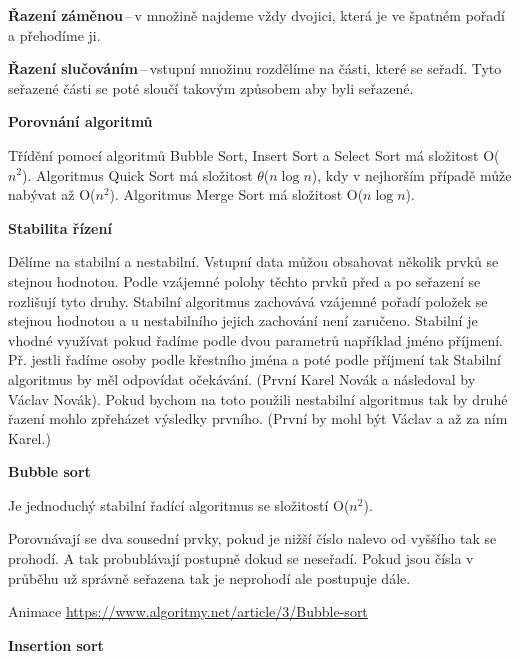 \textbf{Řazení záměnou}\,--\,v množině najdeme vždy dvojici, která je ve špatném pořadí a přehodíme ji.

\textbf{Řazení slučováním}\,--\,vstupní množinu rozdělíme na části, které se seřadí. Tyto seřazené části se poté sloučí takovým způsobem aby byli seřazené.

\begin{Large}\vspace{0,5cm} \textbf{Porovnání algoritmů}
\end{Large}

Třídění pomocí algoritmů Bubble Sort, Insert Sort a Select Sort má složitost O($n^2$). Algoritmus Quick Sort má složitost $\theta$($n\log{n}$), kdy v nejhorším případě může nabývat až O($n^2$). Algoritmus Merge Sort má složitost O($n\log{n}$).

\begin{Large}\vspace{0,5cm} \textbf{Stabilita řízení}
\end{Large}

Dělíme na stabilní a nestabilní. Vstupní data můžou obsahovat několik prvků se stejnou hodnotou. Podle vzájemné polohy těchto prvků před a po seřazení se rozlišují tyto druhy. Stabilní algoritmus zachovává vzájemné pořadí položek se stejnou hodnotou a u nestabilního jejich zachování není zaručeno. Stabilní je vhodné využívat pokud řadíme podle dvou parametrů například jméno příjmení. Př. jestli řadíme osoby podle křestního jména a poté podle příjmení tak Stabilní algoritmus by měl odpovídat očekávání. (První Karel Novák a následoval by Václav Novák). Pokud bychom na toto použili nestabilní algoritmus tak by druhé řazení mohlo zpřeházet výsledky prvního. (První by mohl být Václav a až za ním Karel.)

\begin{Large}\vspace{0,5cm} \textbf{Bubble sort}
\end{Large}

Je jednoduchý stabilní řadící algoritmus se složitostí O($n^2$).

Porovnávají se dva sousední prvky, pokud je nižší číslo nalevo od vyššího tak se prohodí. A tak probublávají postupně dokud se neseřadí. Pokud jsou čísla v průběhu už správně seřazena tak je neprohodí ale postupuje dále.

Animace \url{https://www.algoritmy.net/article/3/Bubble-sort}

\begin{Large}\vspace{0,5cm} \textbf{Insertion sort}
\end{Large}

